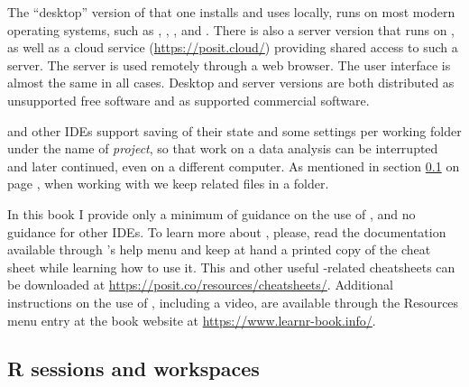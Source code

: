 \documentclass[krantz2]{krantz}\usepackage{knitr}
\begin{document}
The ``desktop'' version of \RStudio that one installs and uses locally, runs on most modern operating systems, such as , , , and . There is also a server version that runs on , as well as a cloud service (\url{https://posit.cloud/}) providing shared access to such a server. The \RStudio server is used remotely through a web browser. The user interface is almost the same in all cases. Desktop and server versions are both distributed as unsupported free software and as supported commercial software.

\RStudio and other IDEs support saving of their state and some settings per working folder under the name of \emph{project}, so that work on a data analysis can be interrupted and later continued, even on a different computer. As mentioned in section \ref{sec:R:workspace} on page \pageref{sec:R:workspace}, when working with \Rlang we keep related files in a folder.

\begin{infobox}
  In this book I provide only a minimum of guidance on the use of \RStudio, and no guidance for other IDEs. To learn more about \RStudio, please, read the documentation available through \RStudio's help menu and keep at hand a printed copy of the \RStudio cheat sheet while learning how to use it. This and other useful \Rlang-related cheatsheets can be downloaded at \url{https://posit.co/resources/cheatsheets/}. Additional instructions on the use of \RStudio, including a video, are available through the Resources menu entry at the book website at \url{https://www.learnr-book.info/}.
\end{infobox}

\subsection{R sessions and workspaces}\label{sec:R:workspace}
\end{document}

